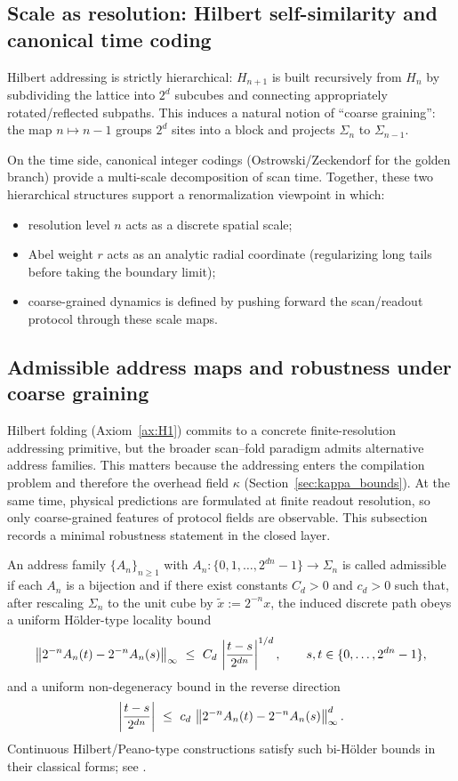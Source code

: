 \subsection{Scale as resolution: Hilbert self-similarity and canonical time coding}
\label{sec:scale_renormalization}

Hilbert addressing is strictly hierarchical: $H_{n+1}$ is built recursively from $H_n$ by subdividing the lattice into $2^d$ subcubes and connecting appropriately rotated/reflected subpaths.
This induces a natural notion of ``coarse graining'':
the map $n\mapsto n-1$ groups $2^d$ sites into a block and projects $\Sigma_n$ to $\Sigma_{n-1}$.

On the time side, canonical integer codings (Ostrowski/Zeckendorf for the golden branch) provide a multi-scale decomposition of scan time.
Together, these two hierarchical structures support a renormalization viewpoint in which:
\begin{itemize}
\item resolution level $n$ acts as a discrete spatial scale;
\item Abel weight $r$ acts as an analytic radial coordinate (regularizing long tails before taking the boundary limit);
\item coarse-grained dynamics is defined by pushing forward the scan/readout protocol through these scale maps.
\end{itemize}

\subsection{Admissible address maps and robustness under coarse graining}
\label{sec:address_robustness}

Hilbert folding (Axiom~\ref{ax:H1}) commits to a concrete finite-resolution addressing primitive, but the broader scan--fold paradigm admits alternative address families.
This matters because the addressing enters the compilation problem and therefore the overhead field $\kappa$ (Section~\ref{sec:kappa_bounds}).
At the same time, physical predictions are formulated at finite readout resolution, so only coarse-grained features of protocol fields are observable.
This subsection records a minimal robustness statement in the closed layer.

\begin{definition}
\label{def:admissible_address_family}
An address family $\{A_n\}_{n\ge 1}$ with $A_n:\{0,1,\dots,2^{dn}-1\}\to\Sigma_n$ is called admissible if each $A_n$ is a bijection and if there exist constants $C_d>0$ and $c_d>0$ such that, after rescaling $\Sigma_n$ to the unit cube by $\tilde x:=2^{-n}x$, the induced discrete path obeys a uniform H\"older-type locality bound
\[
\norm{2^{-n}A_n(t)-2^{-n}A_n(s)}_\infty\ \le\ C_d\,\left|\frac{t-s}{2^{dn}}\right|^{1/d},
\qquad s,t\in\{0,\dots,2^{dn}-1\},
\]
and a uniform non-degeneracy bound in the reverse direction
\[
\left|\frac{t-s}{2^{dn}}\right|\ \le\ c_d\,\norm{2^{-n}A_n(t)-2^{-n}A_n(s)}_\infty^{d}.
\]
Continuous Hilbert/Peano-type constructions satisfy such bi-H\"older bounds in their classical forms; see \cite{Sagan1994}.
\end{definition}

